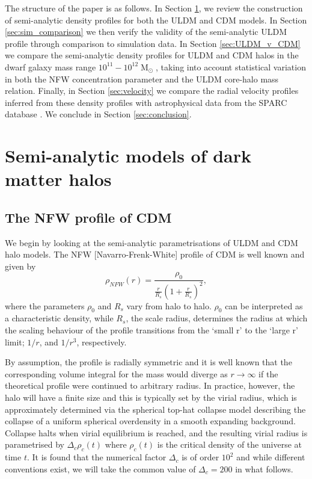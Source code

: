 \documentclass[a4paper,11pt]{article}
\begin{document}
The structure of the paper is as follows. In Section \ref{sec:models}, we review the construction of semi-analytic density profiles for both the ULDM and CDM models. In Section \ref{sec:sim_comparison} we then verify the validity of the semi-analytic ULDM profile  through comparison to simulation data. In Section \ref{sec:ULDM_v_CDM} we compare the semi-analytic density profiles for ULDM and CDM halos in the dwarf galaxy mass range $10^{11} - 10^{12}\operatorname{M}_{\odot}$, taking into account statistical variation in both the NFW concentration parameter and the ULDM core-halo mass relation. Finally, in Section \ref{sec:velocity} we compare the radial velocity profiles inferred from these density profiles with astrophysical data from the SPARC database \cite{Lelli:2016zqa}. We conclude in Section \ref{sec:conclusion}.

\clearpage





\section{Semi-analytic models of dark matter halos}\label{sec:models}


\subsection{The NFW profile of CDM}

We begin by looking at the semi-analytic parametrisations of ULDM and CDM halo models. The  NFW [Navarro-Frenk-White] profile of CDM \cite{Navarro:1995iw, Maccio:2008pcd}  is well known and given by
%
\begin{equation}\label{eq:nfw}
    \rho_{NFW}(r)=\frac{\rho_0}{\frac{r}{R_s}\left(1+\frac{r}{R_s}\right)^2},
\end{equation}
%
where the parameters $\rho_0$ and $R_s$ vary from halo to halo. $\rho_0$ can be interpreted as a characteristic density, while $R_s$, the scale radius, determines the radius at which the scaling behaviour of the profile transitions from the `small r' to the `large r' limit; $1/r$, and $1/r^3$, respectively.

By assumption, the profile is radially symmetric and it is well known that the corresponding volume integral for the mass would diverge as $r\rightarrow \infty$ if the theoretical profile were continued to arbitrary radius. In practice, however, the halo will have a finite size and this is typically set by the virial radius, which is approximately determined via the spherical top-hat collapse model \cite{White:2000jv, Suto:2015jdt, Herrera:2017epn} describing the collapse of a uniform spherical overdensity in a smooth expanding background. Collapse halts when virial equilibrium is reached, and the resulting virial radius is parametrised by $\Delta_c \rho_c(t)$ where $\rho_c(t)$ is the critical density of the universe at time $t$. It is found that the numerical factor $\Delta_c$ is of order $10^2$ and while different conventions exist, we will take the common value of $\Delta_c = 200$ \cite{Richings:2018} in what follows. 
\end{document}
